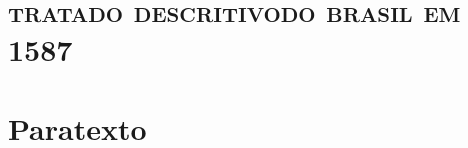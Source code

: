 \part[tratado descritivo do brasil em 1587]{\textsc{tratado descritivo\break do brasil em 1587}} 



\part{Paratexto}

